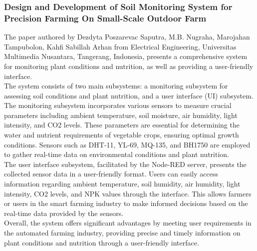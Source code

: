 \documentclass[12pt, a4paper]{article}
\begin{document}
\subsubsection{Design and Development of Soil Monitoring System for Precision Farming On Small-Scale Outdoor Farm}
The paper authored by Dezdyta Poszarevac Saputra, M.B. Nugraha, Marojahan Tampubolon, Kahfi Sabillah Arhan \cite{10435334} from Electrical Engineering, Universitas Multimedia Nusantara, Tangerang, Indonesia, presents a comprehensive system for monitoring plant conditions and nutrition, as well as providing a user-friendly interface.\\
The system consists of two main subsystems: a monitoring subsystem for assessing soil conditions and plant nutrition, and a user interface (UI) subsystem.\\
The monitoring subsystem incorporates various sensors to measure crucial parameters including ambient temperature, soil moisture, air humidity, light intensity, and CO2 levels. These parameters are essential for determining the water and nutrient requirements of vegetable crops, ensuring optimal growth conditions. Sensors such as DHT-11, YL-69, MQ-135, and BH1750 are employed to gather real-time data on environmental conditions and plant nutrition.\\
The user interface subsystem, facilitated by the Node-RED server, presents the collected sensor data in a user-friendly format. Users can easily access information regarding ambient temperature, soil humidity, air humidity, light intensity, CO2 levels, and NPK values through the interface. This allows farmers or users in the smart farming industry to make informed decisions based on the real-time data provided by the sensors.\\
Overall, the system offers significant advantages by meeting user requirements in the automated farming industry, providing precise and timely information on plant conditions and nutrition through a user-friendly interface.
\end{document}
